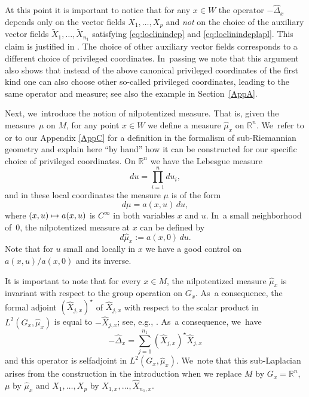 \documentclass[JEP,XML,SOM,Unicode,published]{cedram}
\newcommand\mto{\mathchoice{\longmapsto}{\mapsto}{\mapsto}{\mapsto}}
\theoremstyle{definition}
\newcommand{\1}{\mathbbm{1}}
\newcommand{\R}{\mathbb{R}}
\begin{document}
At this point it is important to notice that for any $x\in W$ the operator $-\widehat\Delta_x$ depends only on the vector fields $X_1,\ldots,X_p$ and \emph{not} on the choice of the auxiliary vector fields $\tilde X_1,\ldots,\tilde X_{n_1}$ satisfying \eqref{eq:loclinindep} and \eqref{eq:loclinindeplapl}. This claim is justified in \hbox{\cite[\S A.5.4]{CHT1}}. The choice of other auxiliary vector fields corresponds to a different choice of privileged coordinates. In~passing we note that this argument also shows that instead of the above canonical privileged coordinates of the first kind one can also choose other so-called privileged coordinates, leading to the same operator and measure; see also the example in Section~\ref{AppA}.

Next, we~introduce the notion of nilpotentized measure. That is, given the measure~$\mu$ on $M$, for any point $x\in W$ we define a measure $\widehat \mu_x$ on $\R^n$. We~refer to \cite[App.\,A.5.6]{CHT1} or to our Appendix \ref{AppC} for a definition in the formalism of sub-Riemannian geometry and explain here ``by hand'' how it can be constructed for our specific choice of privileged coordinates.
On $\mathbb R^n$ we have the Lebesgue measure
\[
du= \prod_{i=1}^n du_{i},
\]
and in these local coordinates the measure $\mu$ is of the form
\[
d\mu = a(x,u) \,du,
\]
where $(x,u)\mto a(x,u)$ is $C^\infty$ in both variables $x$ and $u$. In~a small neighborhood of~$0$, the nilpotentized measure at $x$ can be defined by
\begin{equation}\label{eq:nilpmeas}
d\widehat \mu_x:= a(x,0) \,du.
\end{equation}
Note that for $u$ small and locally in $x$ we have a good control on $a(x,u)/a(x,0)$ and its inverse.

It is important to note that for every $x\in M$, the nilpotentized measure $\widehat\mu_x$ is invariant with respect to the group operation on $G_x$. As~a consequence, the formal adjoint $(\widehat X_{j,x})^\star$ of $\widehat X_{j,x}$ with respect to the scalar product in $L^2(G_x,\widehat\mu_x)$ is equal to $-\widehat X_{j,x}$; see, e.g., \cite[Rem.\,A.5]{CHT1}. As~a consequence, we~have
\[
-\widehat \Delta_x = \sum_{j=1}^{n_1} (\widehat X_{j,x})^\star \widehat X_{j,x}
\]
and this operator is selfadjoint in $L^2(G_x,\widehat\mu_x)$. We~note that this sub-Laplacian arises from the construction in the introduction when we replace $M$ by $G_x=\R^n$, $\mu$ by $\widehat\mu_x$ and $X_1,\ldots,X_p$ by $\widehat X_{1,x},\ldots,\widehat X_{n_1,x}$.
\end{document}
